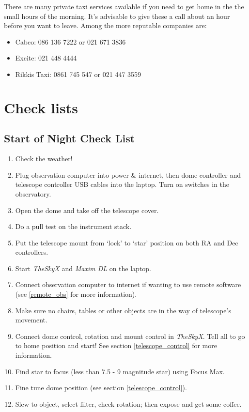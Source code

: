 \documentclass[12pt,twoside,a4paper]{report}
\begin{document}
There are many private taxi services available if you need to get home in the the small hours of the morning. It's advisable to give these a call about an hour before you want to leave. Among the more reputable companies are:
\begin{itemize}
 \item Cabco: 086 136 7222 or 021 671 3836
 \item Excite: 021 448 4444
 \item Rikkis Taxi: 0861 745 547 or 021 447 3559
\end{itemize} 

\clearpage

\section{Check lists}
\label{checklists}


\subsection{Start of Night Check List}

\begin{enumerate}
 \item Check the weather!
 \item Plug observation computer into power \& internet, then dome controller and telescope controller USB cables into the laptop. Turn on switches in the observatory.
 \item Open the dome and take off the telescope cover.
 \item Do a pull test on the instrument stack.
 \item Put the telescope mount from `lock' to `star' position on both RA and Dec controllers.
 \item Start \emph{TheSkyX} and \emph{Maxim DL} on the laptop.
 \item Connect observation computer to internet if wanting to use remote software (see \ref{remote_obs} for more information). 
 \item Make sure no chairs, tables or other objects are in the way of telescope's movement.
 \item Connect dome control, rotation and mount control in \emph{TheSkyX}. Tell all to go to home position and start! 
See section \ref{telescope_control} for more information.
 \item Find star to focus (less than 7.5 - 9 magnitude star) using Focus Max.
  \item Fine tune dome position (see section \ref{telescope_control}).
 \item Slew to object, select filter, check rotation; then expose and get some coffee.
\end{enumerate}
\end{document}
